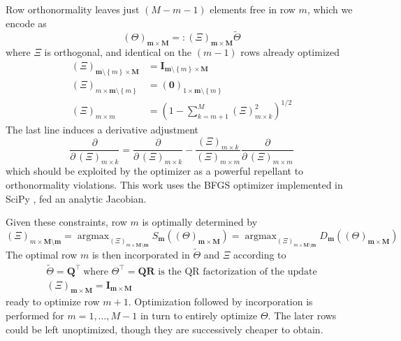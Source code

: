 \documentclass[preprint,12pt]{elsarticle}
\newcommand*{\M}[1]{\ensuremath{#1}\xspace}
\newcommand*{\vr}[1]{\M{\mathbf{#1}}}
\newcommand*{\deqr}{\M{=\mathrel{\mathop:}}}
\newcommand*{\set}[1]{\M{\left\lbrace#1\right\rbrace}}
\DeclareMathOperator*{\argmax}{argmax}
\begin{document}
            Row orthonormality leaves just $(M-m-1)$ elements free in row $m$, which we encode as
            \begin{equation} \label{eq:Method:BO:XiDef}
                (\Theta)_{\vr{m}\times\vr{M}} \deqr (\Xi)_{\vr{m}\times\vr{M}} \tilde{\Theta}
            \end{equation}
            where \(\Xi\) is orthogonal, and identical on the $(m-1)$ rows already optimized
            \begin{equation} \label{eq:Method:BO:XiConstraints}
                \begin{aligned}
                    (\Xi)_{\vr{m}\setminus\set{m}\times\vr{M}} &= \vr{I}_{\vr{m}\setminus\set{m}\times\vr{M}} \\
                    (\Xi)_{m\times\vr{m}\setminus\set{m}} &= (\vr{0})_{1\times\vr{m}\setminus\set{m}} \\
                    (\Xi)_{m\times m} &= \left(1 - \sum_{k=m+1}^{M} (\Xi)_{m\times k}^{2} \right)^{1/2}
                \end{aligned}            
            \end{equation}
            The last line induces a derivative adjustment
            \begin{equation} \label{eq:Method:BO:derivAdjust}
                \frac{\partial}{\partial\,(\Xi)_{m\times k}} = \frac{\partial}{\partial\,(\Xi)_{m\times k}} - 
                \frac{(\Xi)_{m \times k}}{(\Xi)_{m \times m}}\frac{\partial}{\partial\,(\Xi)_{m\times m}}
            \end{equation}
            which should be exploited by the optimizer as a powerful repellant to orthonormality violations.
            This work uses the BFGS optimizer \cite{Nocedal.Wright2006} implemented in SciPy \cite{Virtanen.etal2019}, fed an analytic Jacobian.

            Given these constraints, row $m$ is optimally determined by
            \begin{equation} \label{eq:Method:BO:OptimalRow}
                (\Xi)_{m\times\vr{M}\setminus\vr{m}} = \argmax_{(\Xi)_{m\times\vr{M}\setminus\vr{m}}} S_{\vr{m}}((\Theta)_{\vr{m}\times\vr{M}}) = \argmax_{(\Xi)_{m\times\vr{M}\setminus\vr{m}}} D_{\vr{m}}((\Theta)_{\vr{m}\times\vr{M}})
            \end{equation}
            The optimal row $m$ is then incorporated in $\tilde{\Theta}$ and $\Xi$ according to
            \begin{equation} \label{eq:Method:BO:incorpUpadate}
                \begin{gathered}
                    \tilde{\Theta} = \vr{Q}^{\intercal} \  \text{where } \Theta^{\intercal} = \vr{Q}\vr{R} \text{ is the QR factorization of the update} \\
                    (\Xi)_{\vr{m}\times\vr{M}} = \vr{I}_{\vr{m}\times\vr{M}}
                \end{gathered}
            \end{equation}        
            ready to optimize row $m+1$. 
            Optimization followed by incorporation is performed for $m=1,\ldots, M-1$ in turn to entirely optimize $\Theta$.
            The later rows could be left unoptimized, though they are successively cheaper to obtain.
    
\end{document}
